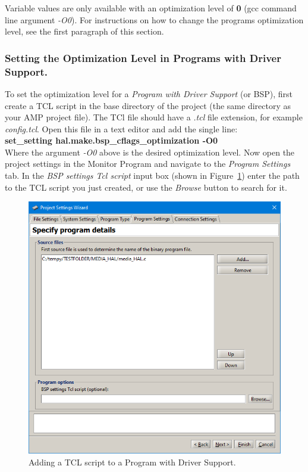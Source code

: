 \documentclass[11pt, twoside, pdftex]{article}
\begin{document}
Variable values are only available with an optimization level of \textbf{0} (gcc command line argument {\it -O0}). For instructions on how to change
the programs optimization level, see the first paragraph of this section.


\subsubsection{Setting the Optimization Level in Programs with Driver Support.}
To set the optimization level for a {\it Program with Driver Support} (or BSP), first create a TCL script in the base directory of the project (the same directory as your AMP project file). The TCl file should have a {\it .tcl} file extension, for example {\it config.tcl}. Open this file in a text editor and add the single line:\\
{\bf set\_setting hal.make.bsp\_cflags\_optimization -O0}\\
Where the argument {\it -O0} above is the desired optimization level. Now open the project settings in the Monitor Program and navigate to the {\it Program Settings} tab. In the {\it BSP settings Tcl script} input box (shown in Figure~\ref{fig:tclScript}) enter the path to the TCL script you just created, or use the {\it Browse} button to search for it.

\begin{figure}[H]
   \begin{center}
      \includegraphics[scale=0.6]{screenshots/tclScript.png}
   \end{center}
   \caption{Adding a TCL script to a Program with Driver Support.}
	 \label{fig:tclScript}
\end{figure}
\end{document}
